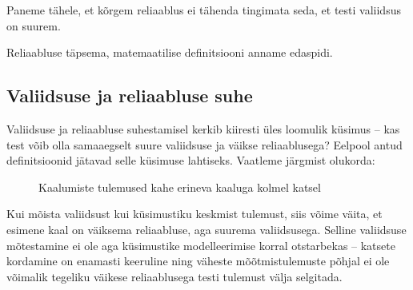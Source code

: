\documentclass[a4paper,12pt,oneside]{article}
\numberwithin{equation}{section}
\theoremstyle{definition}
\begin{document}
Paneme tähele, et kõrgem reliaablus ei tähenda tingimata seda, et testi valiidsus on suurem.

Reliaabluse täpsema, matemaatilise definitsiooni anname edaspidi. 

\subsection{Valiidsuse ja reliaabluse suhe}

Valiidsuse ja reliaabluse suhestamisel kerkib kiiresti üles loomulik küsimus -- kas test võib olla samaaegselt suure valiidsuse ja väikse reliaablusega? Eelpool antud definitsioonid jätavad selle küsimuse lahtiseks. Vaatleme järgmist olukorda:

\begin{figure}[H]
\colorbox{background_example}{\parbox{\textwidth}{
}}
\caption{Kaalumiste tulemused kahe erineva kaaluga kolmel katsel}
\end{figure}

Kui mõista valiidsust kui küsimustiku keskmist tulemust, siis võime väita, et esimene kaal on väiksema reliaabluse, aga suurema valiidsusega. Selline valiidsuse mõtestamine  ei ole aga küsimustike modelleerimise korral otstarbekas -- katsete kordamine on enamasti keeruline ning väheste mõõtmistulemuste põhjal ei ole võimalik tegeliku väikese reliaablusega testi tulemust välja selgitada. 
\end{document}
